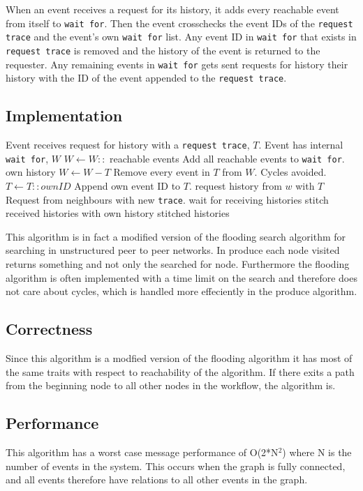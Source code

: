 	When an event receives a request for its history, it adds every reachable event from itself to \texttt{wait for}. Then the event crosschecks the event IDs of the \texttt{request trace} and the event's own \texttt{wait for} list. Any event ID in \texttt{wait for} that exists in \texttt{request trace} is removed and the history of the event is returned to the requester. Any remaining events in \texttt{wait for} gets sent requests for history their history with the ID of the event appended to the \texttt{request trace}. 
	
	\subsection*{Implementation}
	\begin{algorithmic}
		\State Event receives request for history with a \texttt{request trace}, $T$.
		\State Event has internal \texttt{wait for}, $W$
		\State
		\State $W\gets W::$ reachable events \Comment Add all reachable events to \texttt{wait for}.
			\Return own history
		\Else
			\State $W\gets W-T$ \Comment Remove every event in $T$ from $W$. Cycles avoided.
			\State $T\gets T::ownID$ \Comment Append own event ID to $T$.
			\State
				\State request history from $w$ with $T$ \Comment Request from neighbours with new \texttt{trace}.
			\EndFor
			\State wait for receiving histories
			\State stitch received histories with own history
			\State
			\Return stitched histories
		\EndIf
	\end{algorithmic}
	
	\newpar This algorithm is in fact a modified version of the flooding search algorithm for searching in unstructured peer to peer networks. In produce each node visited returns something and not only the searched for node. Furthermore the flooding algorithm is often implemented with a time limit on the search and therefore does not care about cycles, which is handled more effeciently in the produce algorithm.
	
	\subsection*{Correctness}
	Since this algorithm is a modfied version of the flooding algorithm it has most of the same traits with respect to reachability of the algorithm. If there exits a path from the beginning node to all other nodes in the workflow, the algorithm is. 
	
	\subsection{Performance}
	This algorithm has a worst case message performance of O(2*N$^2$) where N is the number of events in the system. This occurs when the graph is fully connected, and all events therefore have relations to all other events in the graph. 
	
